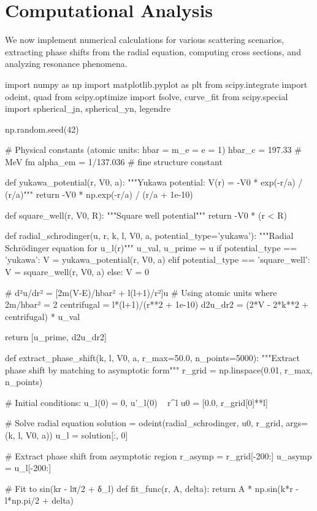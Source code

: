 \documentclass[a4paper, 11pt]{article}
\begin{document}
\section{Computational Analysis}

We now implement numerical calculations for various scattering scenarios, extracting phase
shifts from the radial equation, computing cross sections, and analyzing resonance phenomena.

\begin{pycode}
import numpy as np
import matplotlib.pyplot as plt
from scipy.integrate import odeint, quad
from scipy.optimize import fsolve, curve_fit
from scipy.special import spherical_jn, spherical_yn, legendre

np.random.seed(42)

# Physical constants (atomic units: hbar = m_e = e = 1)
hbar_c = 197.33  # MeV fm
alpha_em = 1/137.036  # fine structure constant

def yukawa_potential(r, V0, a):
    """Yukawa potential: V(r) = -V0 * exp(-r/a) / (r/a)"""
    return -V0 * np.exp(-r/a) / (r/a + 1e-10)

def square_well(r, V0, R):
    """Square well potential"""
    return -V0 * (r < R)

def radial_schrodinger(u, r, k, l, V0, a, potential_type='yukawa'):
    """Radial Schrödinger equation for u_l(r)"""
    u_val, u_prime = u
    if potential_type == 'yukawa':
        V = yukawa_potential(r, V0, a)
    elif potential_type == 'square_well':
        V = square_well(r, V0, a)
    else:
        V = 0

    # d²u/dr² = [2m(V-E)/hbar² + l(l+1)/r²]u
    # Using atomic units where 2m/hbar² = 2
    centrifugal = l*(l+1)/(r**2 + 1e-10)
    d2u_dr2 = (2*V - 2*k**2 + centrifugal) * u_val

    return [u_prime, d2u_dr2]

def extract_phase_shift(k, l, V0, a, r_max=50.0, n_points=5000):
    """Extract phase shift by matching to asymptotic form"""
    r_grid = np.linspace(0.01, r_max, n_points)

    # Initial conditions: u_l(0) = 0, u'_l(0) ~ r^l
    u0 = [0.0, r_grid[0]**l]

    # Solve radial equation
    solution = odeint(radial_schrodinger, u0, r_grid, args=(k, l, V0, a))
    u_l = solution[:, 0]

    # Extract phase shift from asymptotic region
    r_asymp = r_grid[-200:]
    u_asymp = u_l[-200:]

    # Fit to sin(kr - lπ/2 + δ_l)
    def fit_func(r, A, delta):
        return A * np.sin(k*r - l*np.pi/2 + delta)


\end{pycode}
\end{document}
